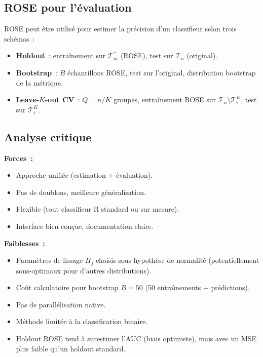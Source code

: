 \documentclass[a4paper,11pt]{article}
\theoremstyle{definition}
\begin{document}
\subsection{ROSE pour l'\'evaluation}

ROSE peut \^etre utilis\'e pour estimer la pr\'ecision d'un
classifieur selon trois sch\'emas~:

\begin{itemize}
  \item \textbf{Holdout}~: entra\^inement sur $\mathcal{T}^*_m$
    (ROSE), test sur $\mathcal{T}_n$ (original).
  \item \textbf{Bootstrap}~: $B$ \'echantillons ROSE, test sur
    l'original, distribution bootstrap de la m\'etrique.
  \item \textbf{Leave-$K$-out CV}~: $Q = n/K$ groupes, entra\^inement
    ROSE sur $\mathcal{T}_n \setminus \mathcal{T}^K_i$, test sur
    $\mathcal{T}^K_i$.
\end{itemize}

\subsection{Analyse critique}

\textbf{Forces~:}
\begin{itemize}
  \item Approche unifi\'ee (estimation + \'evaluation).
  \item Pas de doublons, meilleure g\'en\'eralisation.
  \item Flexible (tout classifieur R standard ou sur mesure).
  \item Interface bien con\c cue, documentation claire.
\end{itemize}

\textbf{Faiblesses~:}
\begin{itemize}
  \item Param\`etres de lissage $H_j$ choisis sous hypoth\`ese de
    normalit\'e (potentiellement sous-optimaux pour d'autres
    distributions).
  \item Co\^ut calculatoire pour bootstrap $B=50$ (50 entra\^\i nements
    + pr\'edictions).
  \item Pas de parall\'elisation native.
  \item M\'ethode limit\'ee \`a la classification binaire.
  \item Holdout ROSE tend \`a surestimer l'AUC (biais optimiste),
    mais avec un MSE plus faible qu'un holdout standard.
\end{itemize}
\end{document}
